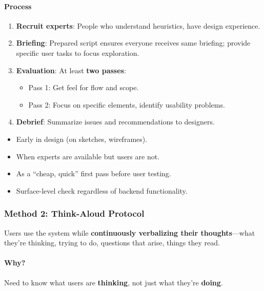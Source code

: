 \paragraph*{Process}
\begin{enumerate}
  \item \textbf{Recruit experts}: People who understand heuristics, have design experience.
  \item \textbf{Briefing}: Prepared script ensures everyone receives same briefing; provide specific user tasks to focus exploration.
  \item \textbf{Evaluation}: At least \textbf{two passes}:
  \begin{itemize}
    \item Pass 1: Get feel for flow and scope.
    \item Pass 2: Focus on specific elements, identify usability problems.
  \end{itemize}
  \item \textbf{Debrief}: Summarize issues and recommendations to designers.
\end{enumerate}

\begin{tipbox}
\begin{itemize}
  \item Early in design (on sketches, wireframes).
  \item When experts are available but users are not.
  \item As a ``cheap, quick'' first pass before user testing.
  \item Surface-level check regardless of backend functionality.
\end{itemize}
\end{tipbox}

\subsubsection*{Method 2: Think-Aloud Protocol}

\begin{defbox}
Users use the system while \textbf{continuously verbalizing their thoughts}---what they're thinking, trying to do, questions that arise, things they read.
\end{defbox}

\paragraph*{Why?}
Need to know what users are \textbf{thinking}, not just what they're \textbf{doing}.

